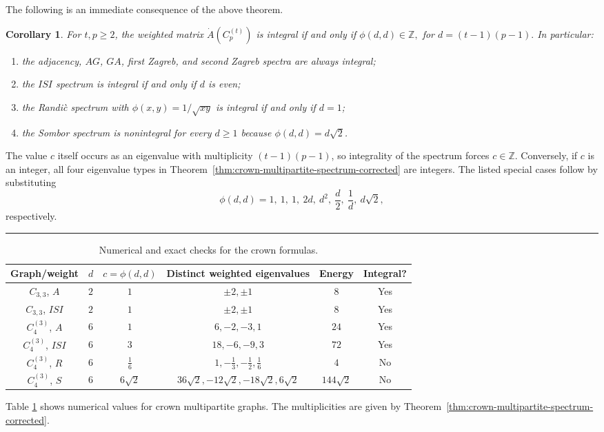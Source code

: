 \documentclass[12pt,twoside]{article}
\renewenvironment{proof}{{\noindent\bfseries Proof.}}{\qed}
\newtheorem{corollary}[theorem]{Corollary}
\def\qed{\nolinebreak\hfill\rule{.2cm}{.2cm}\par\addvspace{.5cm}}
\begin{document}
The following is an immediate consequence of the above theorem.
\begin{corollary}\label{cor:crown-integrality-corrected}
	For $t,p\geq2$, the weighted matrix $\dot A(C_p^{(t)})$ is integral if and only if
	$
	\phi(d,d)\in\mathbb Z,$ for $d=(t-1)(p-1).
	$
	In particular:
	\begin{enumerate}
		\item the adjacency, $AG$, $GA$, first Zagreb, and second Zagreb spectra are always integral;
		\item the $ISI$ spectrum is integral if and only if $d$ is even;
		\item the Randi\`c spectrum with $\phi(x,y)=1/\sqrt{xy}$ is integral if and only if $d=1$;
		\item the Sombor spectrum is nonintegral for every $d\geq1$ because $\phi(d,d)=d\sqrt2$.
	\end{enumerate}
\end{corollary}

\begin{proof}
	The value $c$ itself occurs as an eigenvalue with multiplicity $(t-1)(p-1)$, so integrality of the spectrum forces $c\in\mathbb Z$. Conversely, if $c$ is an integer, all four eigenvalue types in Theorem~\ref{thm:crown-multipartite-spectrum-corrected} are integers. The listed special cases follow by substituting
	$$
	\phi(d,d)=1,~1,~1,~2d,~ d^2,~\frac d2,~\frac1d,~ d\sqrt2,
	$$
	respectively.
\end{proof}

\begin{table}[H]
	\centering
	\small
	\begin{tabular}{|c|c|c|c|c|c|}
		\hline
		Graph/weight & $d$ & $c=\phi(d,d)$ & Distinct weighted eigenvalues & Energy & Integral?\\
		\hline
		$C_{3,3}$, $A$ & $2$ & $1$ & $\pm2,\pm1$ & $8$ & Yes\\
		\hline
		$C_{3,3}$, $ISI$ & $2$ & $1$ & $\pm2,\pm1$ & $8$ & Yes\\
		\hline
		$C_{4}^{(3)}$, $A$ & $6$ & $1$ & $6,-2,-3,1$ & $24$ & Yes\\
		\hline
		$C_{4}^{(3)}$, $ISI$ & $6$ & $3$ & $18,-6,-9,3$ & $72$ & Yes\\
		\hline
		$C_{4}^{(3)}$, $R$ & $6$ & $\tfrac16$ & $1,-\tfrac13,-\tfrac12,\tfrac16$ & $4$ & No\\
		\hline
		$C_{4}^{(3)}$, $S$ & $6$ & $6\sqrt2$ & $36\sqrt2,-12\sqrt2,-18\sqrt2,6\sqrt2$ & $144\sqrt2$ & No\\
		\hline
	\end{tabular}
	\caption{Numerical and exact checks for the crown formulas.}
	\label{tab:crown-numerics}
\end{table}
Table \ref{tab:crown-numerics} shows numerical values for crown multipartite graphs. The multiplicities are given by Theorem~\ref{thm:crown-multipartite-spectrum-corrected}.
\end{document}
